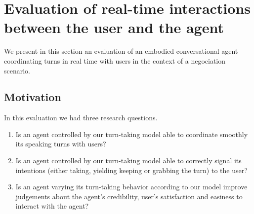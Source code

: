 \section{Evaluation of real-time interactions between the user and the agent}
\label{sec:eval}

We present in this section an evaluation of an embodied conversational agent coordinating turns in real time with users in the context of a negociation scenario.

\subsection{Motivation}

In this evaluation we had three research questions.  \begin{enumerate}
	\item Is an agent controlled by our turn-taking model able to coordinate smoothly its speaking turns with users?
	\item Is an agent controlled by our turn-taking model able to correctly signal its intentions (either taking, yielding keeping or grabbing the turn) to the user?
	\item Is an agent varying its turn-taking behavior according to our model improve judgements about the agent's credibility, user's satisfaction and easiness to interact with the agent?
\end{enumerate}

